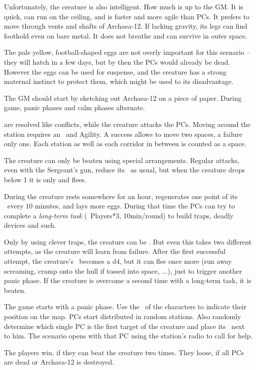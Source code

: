 {		Unfortunately, the creature is also intelligent. How much is up to the GM. It is quick, can run on the ceiling, and is faster and more agile than PCs. It prefers to move through vents and shafts of Archaea-12. If lacking gravity, its legs can find foothold even on bare metal. It does not breathe and can survive in outer space.

		The pale yellow, football-shaped eggs are not overly important for this scenario -- they will hatch in a few days, but by then the PCs would already be dead. However the eggs can be used for suspense, and the creature has a strong maternal instinct to protect them, which might be used to its disadvantage.


		\noindent
		The GM should start by sketching out Archaea-12 on a piece of paper. During game, panic phases and calm phases alternate.

		 are resolved like conflicts, while the creature attacks the PCs. Moving around the station requires an \AD~and Agility. A success allows to move two spaces, a failure only one. Each station as well as each corridor in between is counted as a space.

		The creature can only be beaten using special arrangements. Regular attacks, even with the Sergeant's gun, reduce its \HD\ as usual, but when the creature drops below 1 it is only  and flees.

		During  the creature rests somewhere for an hour, regenerates one point of its \HD\ every 10 minutes, and lays more eggs. During that time the PCs can try to complete a \emph{long-term task} (\TN~Players*3, 10min/round) to build traps, deadly devices and such.

		Only by using clever traps, the creature can be . But even this takes two different attempts, as the creature will learn from failure. After the first successful attempt, the creature's \HD~becomes a d4, but it can flee once more (run away screaming, cramp onto the hull if tossed into space, ...), just to trigger another panic phase. If the creature is overcome a second time with a long-term task, it is beaten.

		The game starts with a panic phase. Use the \HD\ of the characters to indicate their position on the map. PCs start distributed in random stations. Also randomly determine which single PC is the first target of the creature and place its \HD\ next to him. The scenario opens with that PC using the station's radio to call for help.


		\noindent
		The players win, if they can beat the creature two times. They loose, if all PCs are dead or Archaea-12 is destroyed.

}
